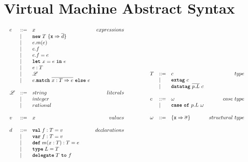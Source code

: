 \documentclass{article}
\newcommand{\keyw}[1]{\texttt{\textbf{#1}}}
\begin{document}
\section{Virtual Machine Abstract Syntax}

\[
\begin{array}{lll}
\begin{array}{lllr}
e & ::= & x & expressions \\
& | & \keyw{new}~T~\{\keyw{x} \Rightarrow \overline{d}\}&\\
& | & e.m(e) &\\
& | & e.f &\\
& | & e.f = e&\\
& | & \keyw{let}~x=e~\keyw{in}~e &\\
& | & e : T&\\
& | & \mathscr{L} &\\
& | & e.\keyw{match}~\overline{x:T \Rightarrow e}~\keyw{else}~e &\\
&&\\
\mathscr{L} & ::= & string & literals \\
& | & integer &\\
& | & rational &\\
&&\\
v & ::= & x & values \\
&&\\
d & ::= & \keyw{val} \; f : T = v & declarations \\
  & |   & \keyw{var} \; f : T = v &\\
  & |   & \keyw{def} \; m(x:T) : T = e &\\
  & |   & \keyw{type} \; L = T &\\
  & |   & \keyw{delegate} \; T~\keyw{to}~f &\\
&&\\
\end{array}
& ~~~~~~
&
\begin{array}{lllr}
T & ::= & c & type \\
& | & \keyw{extag}~c &\\
& | & \keyw{datatag}~\overline{p.L}~c &\\
&&\\
c & ::= & \omega & case ~ type \\
& | & \keyw{case}~\keyw{of}~p.L~\omega &\\
&&\\
\omega & ::= & \{\texttt{x} \Rightarrow \overline{\sigma}\} & structural~type \\

\end{array}
\end{array}\]
\end{document}

